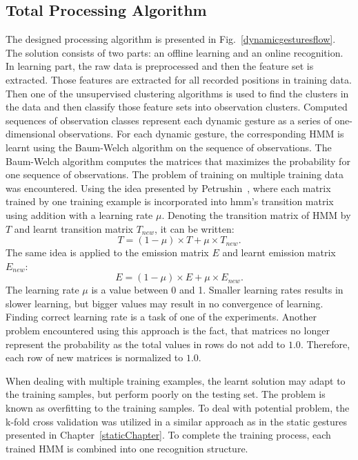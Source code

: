 \subsection{Total Processing Algorithm}
The designed processing algorithm is presented in Fig.~\ref{dynamicgesturesflow}.
The solution consists of two parts: an offline learning and an online recognition.
In learning part, the raw data is preprocessed and then the feature set is extracted. 
Those features are extracted for all recorded positions in training data.
Then one of the unsupervised clustering algorithms is used to find the clusters in the data and then classify those feature sets into observation clusters.
Computed sequences of observation classes represent each dynamic gesture as a series of one-dimensional observations.
For each dynamic gesture, the corresponding HMM is learnt using the Baum-Welch algorithm on the sequence of observations.
The Baum-Welch algorithm computes the matrices that maximizes the probability for one sequence of observations. The problem of training on multiple training data was encountered.
Using the idea presented by Petrushin~\cite{hmmtutorial}, where each matrix trained by one training example is incorporated into hmm's transition matrix using addition with a learning rate $\mu$.
Denoting the transition matrix of HMM by $T$ and learnt transition matrix $T_{new}$, it can be written:
\begin{equation}\label{eq:dynT}
T = (1-\mu) \times T + \mu \times T_{new}.
\end{equation}
The same idea is applied to the emission matrix $E$ and learnt emission matrix $E_{new}$:
\begin{equation}\label{eq:dynE}
E = (1-\mu) \times E + \mu \times E_{new}.
\end{equation}
The learning rate $\mu$ is a value between 0 and 1.
Smaller learning rates results in slower learning, but bigger values may result in no convergence of learning. 
Finding correct learning rate is a task of one of the experiments.
Another problem encountered using this approach is the fact, that matrices no longer represent the probability as the total values in rows do not add to $1.0$.
Therefore, each row of new matrices is normalized to $1.0$.

When dealing with multiple training examples, the learnt solution may adapt to the training samples, but perform poorly on the testing set. 
The problem is known as overfitting to the training samples.
To deal with potential problem, the k-fold cross validation was utilized in a similar approach as in the static gestures presented in Chapter~\ref{staticChapter}.
To complete the training process, each trained HMM is combined into one recognition structure.

